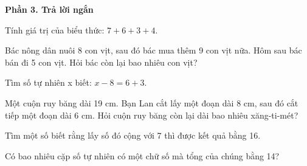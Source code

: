 \textbf{Phần 3. Trả lời ngắn}

\begin{ex} %
Tính giá trị của biểu thức: $7 + 6 + 3 + 4$.
\end{ex}

\begin{ex} %
Bác nông dân nuôi 8 con vịt, sau đó bác mua thêm 9 con vịt nữa. Hôm sau bác bán đi 5 con vịt. Hỏi bác còn lại bao nhiêu con vịt?
\end{ex}

\begin{ex} %
Tìm số tự nhiên x biết: $x - 8 = 6 + 3$.
\end{ex}

\begin{ex} %
Một cuộn ruy băng dài 19 cm. Bạn Lan cắt lấy một đoạn dài 8 cm, sau đó cắt tiếp một đoạn dài 6 cm. Hỏi cuộn ruy băng còn lại dài bao nhiêu xăng-ti-mét?
\end{ex}

\begin{ex} %
Tìm một số biết rằng lấy số đó cộng với 7 thì được kết quả bằng 16.
\end{ex}

\begin{ex} %
Có bao nhiêu cặp số tự nhiên có một chữ số mà tổng của chúng bằng 14?
\end{ex}
